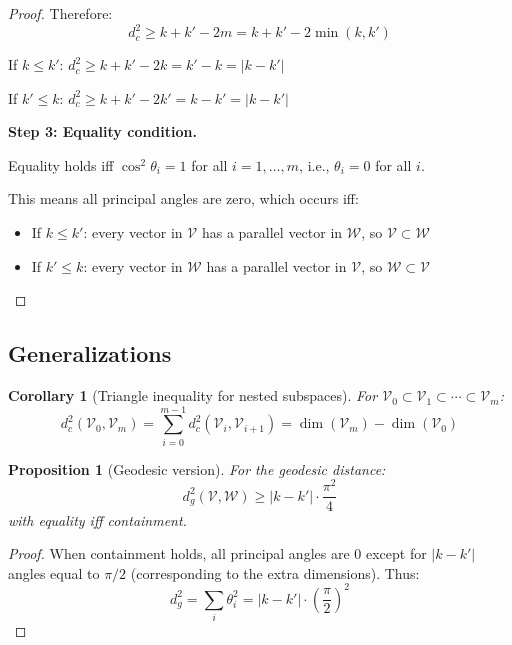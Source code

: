 \documentclass[11pt,a4paper]{article}
\newtheorem{proposition}[theorem]{Proposition}
\newtheorem{corollary}[theorem]{Corollary}
\begin{document}
\begin{proof}
Therefore:
\begin{equation}
    d_c^2 \geq k + k' - 2m = k + k' - 2\min(k,k')
\end{equation}

If $k \leq k'$: $d_c^2 \geq k + k' - 2k = k' - k = |k - k'|$

If $k' \leq k$: $d_c^2 \geq k + k' - 2k' = k - k' = |k - k'|$

\textbf{Step 3: Equality condition.}

Equality holds iff $\cos^2\theta_i = 1$ for all $i = 1, \ldots, m$, i.e., $\theta_i = 0$ for all $i$.

This means all principal angles are zero, which occurs iff:
\begin{itemize}
    \item If $k \leq k'$: every vector in $\mathcal{V}$ has a parallel vector in $\mathcal{W}$, so $\mathcal{V} \subset \mathcal{W}$
    \item If $k' \leq k$: every vector in $\mathcal{W}$ has a parallel vector in $\mathcal{V}$, so $\mathcal{W} \subset \mathcal{V}$
\end{itemize}
\end{proof}

\subsection{Generalizations}

\begin{corollary}[Triangle inequality for nested subspaces]
For $\mathcal{V}_0 \subset \mathcal{V}_1 \subset \cdots \subset \mathcal{V}_m$:
\begin{equation}
    d_c^2(\mathcal{V}_0, \mathcal{V}_m) = \sum_{i=0}^{m-1} d_c^2(\mathcal{V}_i, \mathcal{V}_{i+1}) = \dim(\mathcal{V}_m) - \dim(\mathcal{V}_0)
\end{equation}
\end{corollary}

\begin{proposition}[Geodesic version]
For the geodesic distance:
\begin{equation}
    d_g^2(\mathcal{V}, \mathcal{W}) \geq |k - k'| \cdot \frac{\pi^2}{4}
\end{equation}
with equality iff containment.
\end{proposition}

\begin{proof}
When containment holds, all principal angles are 0 except for $|k-k'|$ angles equal to $\pi/2$ (corresponding to the extra dimensions). Thus:
\begin{equation}
    d_g^2 = \sum_i \theta_i^2 = |k-k'| \cdot \left(\frac{\pi}{2}\right)^2
\end{equation}
\end{proof}
\end{document}
